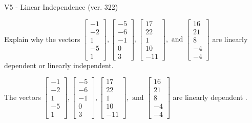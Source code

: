 \begin{exercise}
  \begin{exerciseTitle}V5 - Linear Independence (ver. 322)\end{exerciseTitle}
  \begin{exerciseStatement}
    Explain why the vectors \(\left[\begin{array}{r}
-1 \\
-2 \\
1 \\
-5 \\
1
\end{array}\right] , \left[\begin{array}{r}
-5 \\
-6 \\
-1 \\
0 \\
3
\end{array}\right] , \left[\begin{array}{r}
17 \\
22 \\
1 \\
10 \\
-11
\end{array}\right] , \text{ and } \left[\begin{array}{r}
16 \\
21 \\
8 \\
-4 \\
-4
\end{array}\right]\) are linearly dependent or linearly independent.	


  \end{exerciseStatement}
  \begin{exerciseAnswer}
   The vectors \(\left[\begin{array}{r}
-1 \\
-2 \\
1 \\
-5 \\
1
\end{array}\right] , \left[\begin{array}{r}
-5 \\
-6 \\
-1 \\
0 \\
3
\end{array}\right] , \left[\begin{array}{r}
17 \\
22 \\
1 \\
10 \\
-11
\end{array}\right] , \text{ and } \left[\begin{array}{r}
16 \\
21 \\
8 \\
-4 \\
-4
\end{array}\right]\) are 
  	 linearly dependent  .
  


  \end{exerciseAnswer}
\end{exercise}